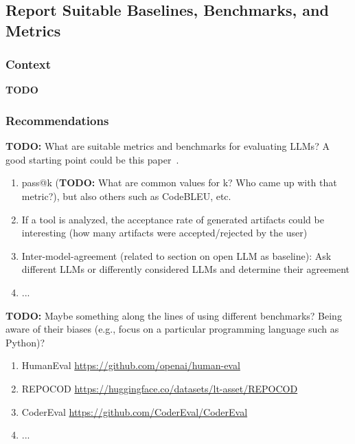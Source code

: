 \documentclass[11pt]{article}
\begin{document}
\subsection{Report Suitable Baselines, Benchmarks, and Metrics}

\subsubsection{Context}

\textbf{TODO}

\subsubsection{Recommendations}

\textbf{TODO:} What are suitable metrics and benchmarks for evaluating LLMs? A good starting point could be this paper~\cite{10.1145/3695988}.

\begin{enumerate}
\item pass@k (\textbf{TODO:} What are common values for k? Who came up with that metric?), but also others such as CodeBLEU, etc.
\item If a tool is analyzed, the acceptance rate of generated artifacts could be interesting (how many artifacts were accepted/rejected by the user)
\item Inter-model-agreement (related to section on open LLM as baseline): Ask different LLMs or differently considered LLMs and determine their agreement 
\item ...
\end{enumerate}

\textbf{TODO:} Maybe something along the lines of using different benchmarks? Being aware of their biases (e.g., focus on a particular programming language such as Python)?


\begin{enumerate}
\item HumanEval \url{https://github.com/openai/human-eval}
\item REPOCOD \url{https://huggingface.co/datasets/lt-asset/REPOCOD}
\item CoderEval \url{https://github.com/CoderEval/CoderEval}
\item ...
\end{enumerate}
\end{document}

